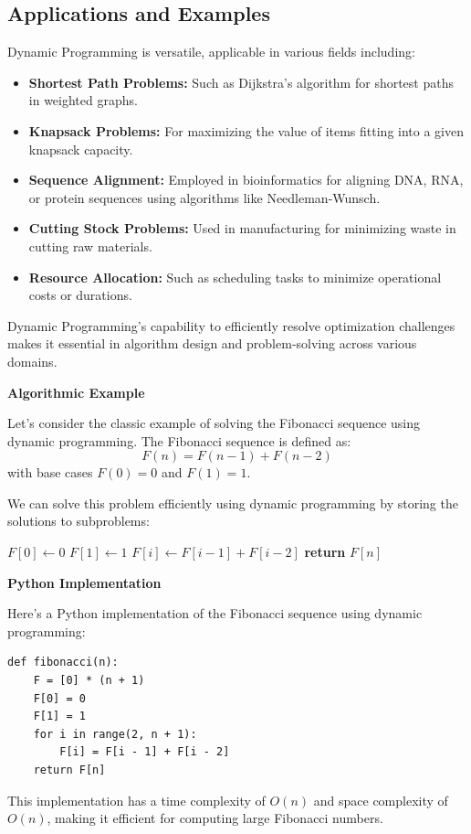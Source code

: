 \documentclass[12pt]{book} %
\begin{document}
\subsection{Applications and Examples}
Dynamic Programming is versatile, applicable in various fields including:
\begin{itemize}
    \item \textbf{Shortest Path Problems:} Such as Dijkstra's algorithm for shortest paths in weighted graphs.
    \item \textbf{Knapsack Problems:} For maximizing the value of items fitting into a given knapsack capacity.
    \item \textbf{Sequence Alignment:} Employed in bioinformatics for aligning DNA, RNA, or protein sequences using algorithms like Needleman-Wunsch.
    \item \textbf{Cutting Stock Problems:} Used in manufacturing for minimizing waste in cutting raw materials.
    \item \textbf{Resource Allocation:} Such as scheduling tasks to minimize operational costs or durations.
\end{itemize}

Dynamic Programming's capability to efficiently resolve optimization challenges makes it essential in algorithm design and problem-solving across various domains.

\textbf{Algorithmic Example}

Let's consider the classic example of solving the Fibonacci sequence using dynamic programming. The Fibonacci sequence is defined as:
\[ F(n) = F(n-1) + F(n-2) \]
with base cases \( F(0) = 0 \) and \( F(1) = 1 \).

We can solve this problem efficiently using dynamic programming by storing the solutions to subproblems:
\FloatBarrier
\begin{algorithm}
\caption{Dynamic Programming for Fibonacci Sequence}\label{fib_dp}
\begin{algorithmic}[1]
\State $F[0] \gets 0$
\State $F[1] \gets 1$
\State $F[i] \gets F[i-1] + F[i-2]$
\EndFor
\State \textbf{return} $F[n]$
\EndProcedure
\end{algorithmic}
\end{algorithm}
\FloatBarrier
\textbf{Python Implementation}

Here's a Python implementation of the Fibonacci sequence using dynamic programming:
\FloatBarrier
\begin{lstlisting}
def fibonacci(n):
    F = [0] * (n + 1)
    F[0] = 0
    F[1] = 1
    for i in range(2, n + 1):
        F[i] = F[i - 1] + F[i - 2]
    return F[n]
\end{lstlisting}
\FloatBarrier
This implementation has a time complexity of \( O(n) \) and space complexity of \( O(n) \), making it efficient for computing large Fibonacci numbers.
\end{document}
